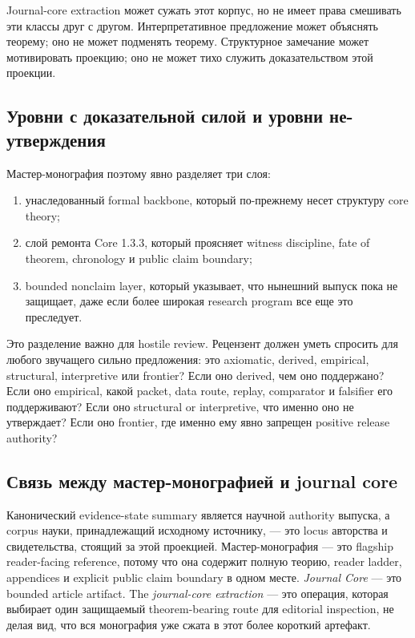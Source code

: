 Journal-core extraction может сужать этот корпус, но не имеет права
смешивать эти классы друг с другом.
Интерпретативное предложение может объяснять теорему; оно не может
подменять теорему.
Структурное замечание может мотивировать проекцию; оно не может
тихо служить доказательством этой проекции.

\subsection{Уровни с доказательной силой и уровни не-утверждения}

Мастер-монография поэтому явно разделяет три слоя:

\begin{enumerate}
\item унаследованный formal backbone, который по-прежнему несет структуру
      core theory;
\item слой ремонта Core 1.3.3, который проясняет witness discipline, fate of
      theorem, chronology и public claim boundary;
\item bounded nonclaim layer, который указывает, что нынешний выпуск пока
      не защищает, даже если более широкая research program все еще это
      преследует.
\end{enumerate}

Это разделение важно для hostile review.
Рецензент должен уметь спросить для любого звучащего сильно предложения:
это axiomatic, derived, empirical, structural, interpretive или frontier?
Если оно derived, чем оно поддержано?
Если оно empirical, какой packet, data route, replay, comparator и
falsifier его поддерживают?
Если оно structural or interpretive, что именно оно не утверждает?
Если оно frontier, где именно ему явно запрещен positive release authority?

\subsection{Связь между мастер-монографией и journal core}

Канонический evidence-state summary является научной authority выпуска, а corpus науки,
принадлежащий исходному источнику, — это locus авторства и свидетельства,
стоящий за этой проекцией. Мастер-монография — это flagship reader-facing
reference, потому что она содержит полную теорию, reader ladder, appendices
и explicit public claim boundary в одном месте.
\emph{Journal Core} — это bounded article artifact. The
\emph{journal-core extraction} — это операция, которая выбирает один
защищаемый theorem-bearing route для editorial inspection, не делая вид, что
вся монография уже сжата в этот более короткий артефакт.

